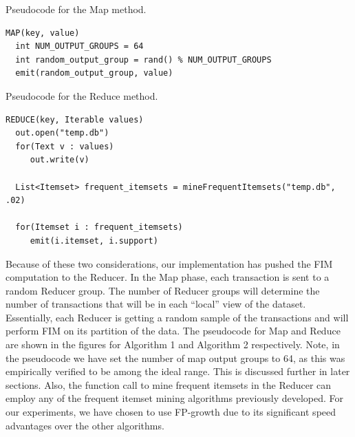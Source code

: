 \documentclass[11pt]{article}
\begin{document}
\begin{algorithm}
\caption{Pseudocode for the Map method.}
\label{map}
\begin{algorithmic}
\begin{verbatim}
MAP(key, value)
  int NUM_OUTPUT_GROUPS = 64
  int random_output_group = rand() % NUM_OUTPUT_GROUPS 
  emit(random_output_group, value)
\end{verbatim} 
\end{algorithmic}
\end{algorithm}

\begin{algorithm}
\caption{Pseudocode for the Reduce method.}
\label{reduce}
\begin{algorithmic}
\begin{verbatim}
REDUCE(key, Iterable values)
  out.open("temp.db") 
  for(Text v : values)
     out.write(v)

  List<Itemset> frequent_itemsets = mineFrequentItemsets("temp.db", .02)

  for(Itemset i : frequent_itemsets)
     emit(i.itemset, i.support) 
\end{verbatim} 
\end{algorithmic}
\end{algorithm}

Because of these two considerations, our implementation has pushed the
FIM computation to the Reducer. In the Map phase, each transaction is
sent to a random Reducer group. The number of Reducer groups will
determine the number of transactions that will be in each ``local''
view of the dataset. Essentially, each Reducer is getting a random
sample of the transactions and will perform FIM on its partition of
the data. The pseudocode for Map and Reduce are shown in the figures
for Algorithm 1 and Algorithm 2 respectively. Note, in the pseudocode
we have set the number of map output groups to 64, as this was
empirically verified to be among the ideal range. This is discussed
further in later sections. Also, the function call to mine frequent
itemsets in the Reducer can employ any of the frequent itemset mining
algorithms previously developed. For our experiments, we have chosen
to use FP-growth due to its significant speed advantages over the
other algorithms.
\end{document}
